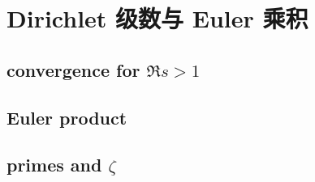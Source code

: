 \section{Dirichlet 级数与 Euler 乘积}
\label{b3:sec:2601}


\subsection{convergence for \texorpdfstring{\(\Re s>1\)}{>1}}
\label{b3:subsec:260101}

\subsection{Euler product}
\label{b3:subsec:260102}

\subsection{primes and \texorpdfstring{\(\zeta\)}{ζ}}
\label{b3:subsec:260103}


